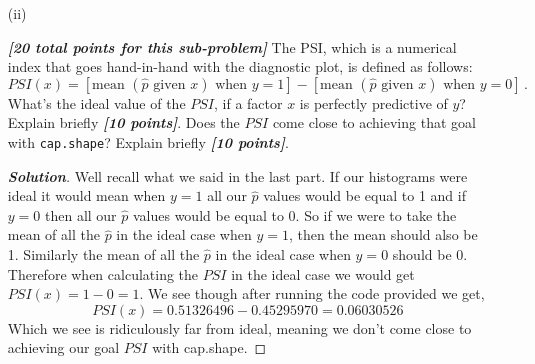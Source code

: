 \documentclass[12pt]{article}
\newenvironment{solution}{\begin{tcolorbox}[breakable]\begin{proof}[\textbf{\textit{Solution}}] }{\end{proof}\end{tcolorbox}}
\newcommand{\bi}[1]{\textbf{\textit{#1}}}
\begin{document}
\begin{itemize}
\begin{itemize}
\begin{solution}
    For the histogram of $y = 0$, the ideal shape would be a single spike at 0, meaning all $\hat{p}$ equalling 0 and nothing else. For when $y = 1$, the ideal shape would be a single spike at 1, meaning all the $\hat{p}$ equalling 1 and nothing else. This is because this would mean they are perfect predictions since our true value for the histograms is either $y = 0 $ or $1$, without loss of generality, if $y = 1$ ideally we would want to have perfect prediction, meaning all the $\hat{p} = 1$ since that is the truth.  

    Knowing these ideal histograms and comparing, we see cap.shape is a horrible predictor. This is because we see for both graphs most the spikes are concentrated at around 0.48, far away from what we ideally want. 
\end{solution}

\item[(ii)]

\bi{[20 total points for this sub-problem]} The PSI, which is a numerical index that goes hand-in-hand with the diagnostic plot, is defined as follows:
\begin{equation} \label{e:psi-1}
PSI ( x ) = [ \textrm{mean } ( \hat{ p } \textrm{ given } x ) \textrm{ when } y = 1 ] - [ \textrm{mean } ( \hat{ p } \textrm{ given } x ) \textrm{ when } y = 0 ] \, .
\end{equation}
What's the ideal value of the $PSI$, if a factor $x$ is perfectly predictive of $y$? Explain briefly \bi{[10 points]}. Does the $PSI$ come close to achieving that goal with \texttt{cap.shape}? Explain briefly \bi{[10 points]}.

\begin{solution}
    Well recall what we said in the last part. If our histograms were ideal it would mean when $y = 1$ all our $\hat{p}$ values would be equal to 1 and if $y = 0$ then all our $\hat{p}$ values would be equal to 0. So if we were to take the mean of all the $\hat{p}$ in the ideal case when $y = 1$, then the mean should also be 1. Similarly the mean of all the $\hat{p}$ in the ideal case when $y = 0$ should be 0. Therefore when calculating the $PSI$ in the ideal case we would get $PSI(x) = 1 - 0 = 1$. We see though after running the code provided we get, 
    \[PSI(x) =0.51326496 -  0.45295970  =  0.06030526\]
    Which we see is ridiculously far from ideal, meaning we don't come close to achieving our goal $PSI$ with cap.shape.
\end{solution}


\end{itemize}
\end{itemize}
\end{document}
